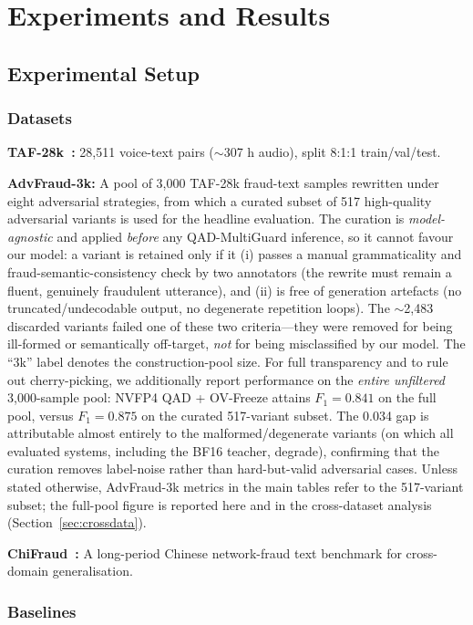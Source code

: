 \documentclass[final,5p,times,number]{elsarticle}
\begin{document}
\section{Experiments and Results}\label{sec:experiments}
\subsection{Experimental Setup}
\subsubsection{Datasets}

\textbf{TAF-28k~\cite{1}:} 28{,}511 voice-text pairs ($\sim$307 h audio), split 8:1:1 train/val/test.

\textbf{AdvFraud-3k:} A pool of 3{,}000 TAF-28k fraud-text samples rewritten under eight adversarial strategies, from which a curated subset of 517 high-quality adversarial variants is used for the headline evaluation. The curation is \emph{model-agnostic} and applied \emph{before} any QAD-MultiGuard inference, so it cannot favour our model: a variant is retained only if it (i) passes a manual grammaticality and fraud-semantic-consistency check by two annotators (the rewrite must remain a fluent, genuinely fraudulent utterance), and (ii) is free of generation artefacts (no truncated/undecodable output, no degenerate repetition loops). The $\sim$2{,}483 discarded variants failed one of these two criteria---they were removed for being ill-formed or semantically off-target, \emph{not} for being misclassified by our model. The ``3k'' label denotes the construction-pool size. For full transparency and to rule out cherry-picking, we additionally report performance on the \emph{entire unfiltered} 3{,}000-sample pool: NVFP4 QAD + OV-Freeze attains $F_1 = 0.841$ on the full pool, versus $F_1 = 0.875$ on the curated 517-variant subset. The 0.034 gap is attributable almost entirely to the malformed/degenerate variants (on which all evaluated systems, including the BF16 teacher, degrade), confirming that the curation removes label-noise rather than hard-but-valid adversarial cases. Unless stated otherwise, AdvFraud-3k metrics in the main tables refer to the 517-variant subset; the full-pool figure is reported here and in the cross-dataset analysis (Section~\ref{sec:crossdata}).

\textbf{ChiFraud~\cite{chifraud}:} A long-period Chinese network-fraud text benchmark for cross-domain generalisation.

\subsubsection{Baselines}
\end{document}
